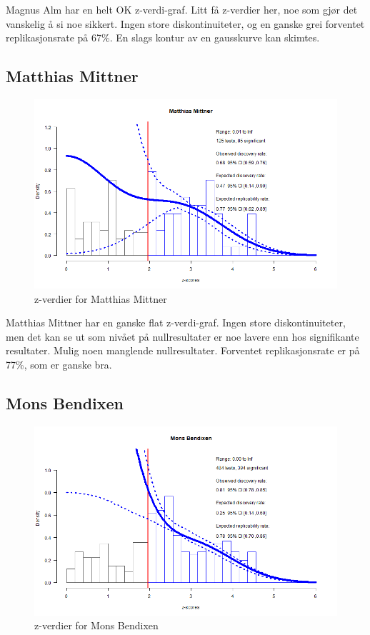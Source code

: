 \documentclass[doc,norsk]{apa7}
\begin{document}
Magnus Alm har en helt OK z-verdi-graf. Litt få z-verdier her, noe som gjør det vanskelig å si noe sikkert. Ingen store diskontinuiteter, og en ganske grei forventet replikasjonsrate på 67\%. En slags kontur av en gausskurve kan skimtes.

\subsection{Matthias Mittner}
\begin{figure}[h!]
    \centering
    \includegraphics[width=\textwidth]{images/Matthias Mittner.png}
    \caption{z-verdier for Matthias Mittner}
\end{figure}

Matthias Mittner har en ganske flat z-verdi-graf. Ingen store diskontinuiteter, men det kan se ut som nivået på nullresultater er noe lavere enn hos signifikante resultater. Mulig noen manglende nullresultater. Forventet replikasjonsrate er på 77\%, som er ganske bra.

\subsection{Mons Bendixen}
\begin{figure}[h!]
    \centering
    \includegraphics[width=\textwidth]{images/Mons Bendixen.png}
    \caption{z-verdier for Mons Bendixen}
\end{figure}
\end{document}
